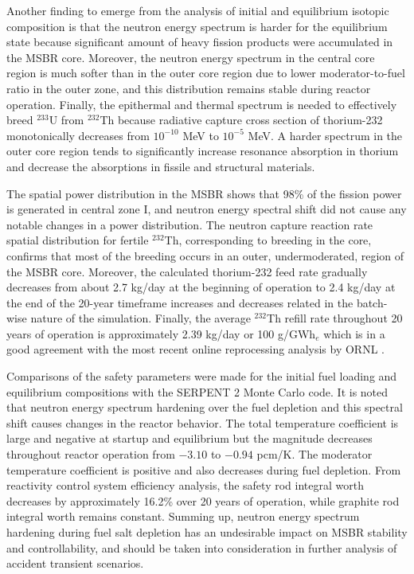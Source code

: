 Another finding to emerge from the analysis of initial and equilibrium isotopic composition is that the neutron energy spectrum is harder for the equilibrium state because significant amount of heavy fission products were accumulated in the \gls{MSBR} core. Moreover, the neutron energy spectrum in the central core region is much softer than in the outer core region due to lower moderator-to-fuel ratio in the outer zone, and this distribution remains stable during reactor operation. Finally, the epithermal and thermal spectrum is needed to effectively breed $^{233}$U from $^{232}$Th because radiative capture cross section of thorium-232 monotonically decreases from $10^{-10}$ MeV to $10^{-5}$ MeV. A harder spectrum in the outer core region tends to significantly increase resonance absorption in thorium and decrease the absorptions in fissile and structural materials. 

The spatial power distribution in the \gls{MSBR} shows that 98\% of the fission power is generated in central zone I, and neutron energy spectral shift did not cause any notable changes in a power distribution. The neutron capture reaction rate spatial distribution for fertile $^{232}$Th, corresponding to breeding in the core, confirms that most of the breeding occurs in an outer, undermoderated, region of the \gls{MSBR} core. Moreover, the calculated thorium-232 feed rate gradually decreases from about 2.7 kg/day at the beginning of operation to 2.4 kg/day at the end of the 20-year timeframe increases and decreases related in the batch-wise nature of the simulation. Finally, the average $^{232}$Th refill rate throughout 20 years of operation is approximately 2.39 kg/day or 100 g/GWh$_e$ which is in a good agreement with the most recent online reprocessing analysis by \gls{ORNL} \cite{betzler_molten_2017}.

Comparisons of the safety parameters were made for the initial fuel loading and equilibrium compositions with the SERPENT 2 Monte Carlo code. It is noted that neutron energy spectrum hardening over the fuel depletion and this spectral shift causes changes in the reactor behavior. The total temperature coefficient is large and negative at startup and equilibrium but the magnitude decreases throughout reactor operation from $-3.10$ to $-0.94$ pcm/K. The moderator temperature coefficient is positive and also decreases during fuel depletion. From reactivity control system efficiency analysis, the safety rod integral worth decreases by approximately 16.2\% over 20 years of operation, while graphite rod integral worth remains constant. Summing up, neutron energy spectrum hardening during fuel salt depletion has an undesirable impact on \gls{MSBR} stability and controllability, and should be taken into consideration in further analysis of accident transient scenarios.

